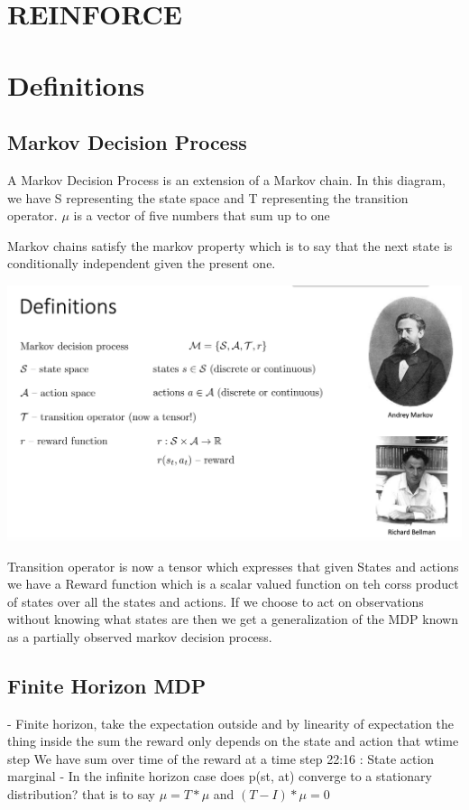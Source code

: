 \documentclass{article}
\begin{document}
\section{REINFORCE}


\section{Definitions}


\subsection{Markov Decision Process}
A Markov Decision Process is an extension of a Markov chain. In this diagram, we have S representing the state space and T representing the transition operator. $\mu$ is a vector of five numbers that sum up to one 

Markov chains satisfy the markov property which is to say that the next state is conditionally independent given the present one.

\includegraphics[scale=0.25]{mdp}

Transition operator is now a tensor which expresses that given States and actions we have a Reward function which is a scalar valued function on teh corss product of states over all the states and actions.
If we choose to act on observations without knowing what states are then we get a generalization of the MDP known as a partially observed markov decision process.


\subsection{Finite Horizon MDP}
- Finite horizon, take the expectation outside and by linearity of expectation the thing inside the sum the reward only depends on the state and action that wtime step
We have sum over time of the reward at a time step
22:16 : State action marginal
- In the infinite horizon case does p(st, at) converge to a stationary distribution? that is to say $\mu = T * \mu$
and $(T- I) * \mu =0$
\end{document}
